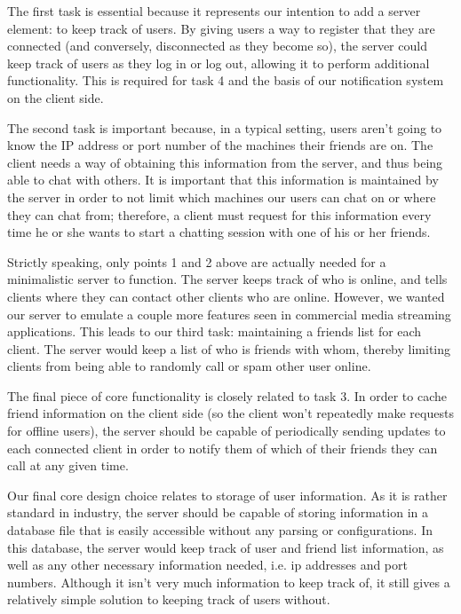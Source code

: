 The first task is essential because it represents
our intention to add a server element: to keep track of users.
By giving users a way to register that they are connected (and conversely,
disconnected as they become so), the server could keep track of
users as they log in or log out, allowing it to perform additional functionality. This 
is required for task 4 and the basis of our notification system on the client side. 

The second task is important because, in a typical setting, users aren't going to
know the IP address or port number of the machines their friends are on.
The client needs a way of obtaining this information from the server, and thus being
able to chat with others. It is important that this information is maintained by the
server in order to not limit which machines our users can chat on or where they can 
chat from; therefore, a client must request for this information every time he or she
wants to start a chatting session with one of his or her friends.

Strictly speaking, only points 1 and 2 above are actually needed for a minimalistic
server to function. The server keeps track of who is online, and tells clients where
they can contact other clients who are online. However, we wanted our server to
emulate a couple more features seen in commercial media streaming applications. This 
leads to our third task: maintaining a friends list for each client.
The server would keep a list of who is friends with whom, thereby limiting clients
from being able to randomly call or spam other user online.

The final piece of core functionality is closely related to task 3. In order
to cache friend information on the client side (so the client won't repeatedly make requests
for offline users), the server should be capable of periodically sending updates to each
connected client in order to notify them of which of their friends they can call at 
any given time.

Our final core design choice relates to storage of user information. As it is rather 
standard in industry, the server should be capable of storing information in a database 
file that is easily accessible without any parsing or configurations. In this database, the 
server would keep track of user and friend list information, as well as any other necessary
information needed, i.e. ip addresses and port numbers. Although it isn't very much 
information to keep track of, it still gives a relatively simple solution to keeping track 
of users without.
 
